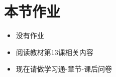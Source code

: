 \documentclass[17pt]{beamer}
\begin{document}
\section{本节作业}

\begin{frame}{\insertsection }
  \begin{itemize}
    \item
      没有作业\string~
    \item
      阅读教材第13课相关内容
    \bigskip
    \item
      现在请做学习通\nobreakdash-章节\nobreakdash-课后问卷
  \end{itemize}
\end{frame}
\end{document}

